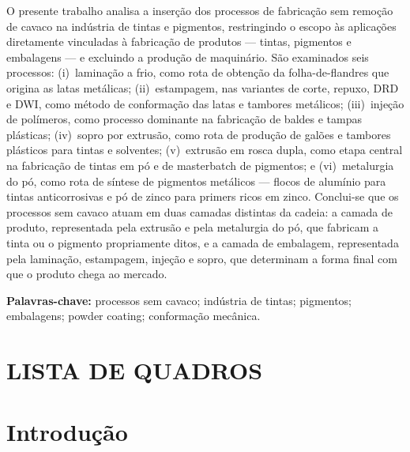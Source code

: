\documentclass[
  12pt,
  a4paper,
  oneside,
  brazil,
  chapter=TITLE
]{article}
\makeatletter
\newcommand{\secbreak}{\clearpage}
\let\oldsection\section
\renewcommand{\section}{\secbreak\oldsection}
\renewcommand{\listofquadros}{%
  \section*{LISTA DE QUADROS}%
  \@starttoc{loq}%
}
\makeatother
\begin{document}
\vspace{1em}
\noindent
O presente trabalho analisa a inserção dos processos de fabricação sem remoção
de cavaco na indústria de tintas e pigmentos, restringindo o escopo às
aplicações diretamente vinculadas à fabricação de produtos --- tintas, pigmentos
e embalagens --- e excluindo a produção de maquinário. São examinados seis
processos: (i)~laminação a frio, como rota de obtenção da folha-de-flandres que
origina as latas metálicas; (ii)~estampagem, nas variantes de corte, repuxo, DRD
e DWI, como método de conformação das latas e tambores metálicos;
(iii)~injeção de polímeros, como processo dominante na fabricação de baldes e
tampas plásticas; (iv)~sopro por extrusão, como rota de produção de galões e
tambores plásticos para tintas e solventes; (v)~extrusão em rosca dupla, como
etapa central na fabricação de tintas em pó e de masterbatch de pigmentos; e
(vi)~metalurgia do pó, como rota de síntese de pigmentos metálicos --- flocos de
alumínio para tintas anticorrosivas e pó de zinco para primers ricos em zinco.
Conclui-se que os processos sem cavaco atuam em duas camadas distintas da cadeia:
a camada de produto, representada pela extrusão e pela metalurgia do pó, que
fabricam a tinta ou o pigmento propriamente ditos, e a camada de embalagem,
representada pela laminação, estampagem, injeção e sopro, que determinam a forma
final com que o produto chega ao mercado.

\vspace{1em}
\noindent\textbf{Palavras-chave:} processos sem cavaco; indústria de tintas;
pigmentos; embalagens; powder coating; conformação mecânica.

\clearpage
\thispagestyle{empty}
\listofquadros

\clearpage
\thispagestyle{empty}
\tableofcontents


\section{Introdução}\label{introducao}
\end{document}
